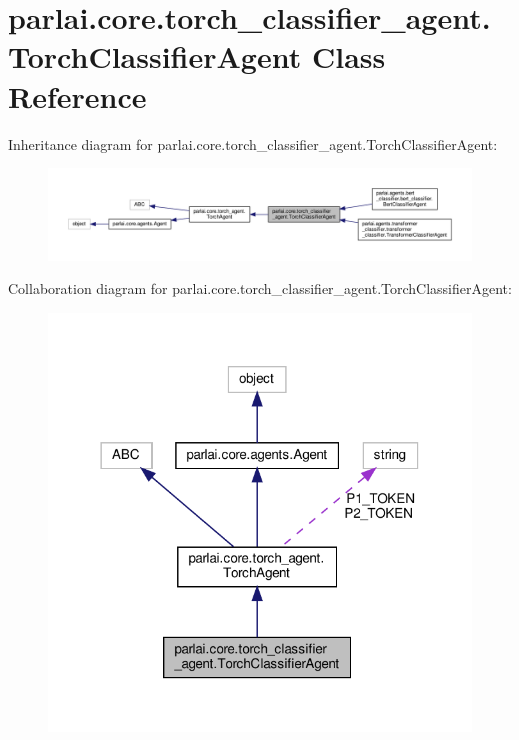 \hypertarget{classparlai_1_1core_1_1torch__classifier__agent_1_1TorchClassifierAgent}{}\section{parlai.\+core.\+torch\+\_\+classifier\+\_\+agent.\+Torch\+Classifier\+Agent Class Reference}
\label{classparlai_1_1core_1_1torch__classifier__agent_1_1TorchClassifierAgent}


Inheritance diagram for parlai.\+core.\+torch\+\_\+classifier\+\_\+agent.\+Torch\+Classifier\+Agent\+:
\nopagebreak
\begin{figure}[H]
\begin{center}
\leavevmode
\includegraphics[width=350pt]{classparlai_1_1core_1_1torch__classifier__agent_1_1TorchClassifierAgent__inherit__graph}
\end{center}
\end{figure}


Collaboration diagram for parlai.\+core.\+torch\+\_\+classifier\+\_\+agent.\+Torch\+Classifier\+Agent\+:
\nopagebreak
\begin{figure}[H]
\begin{center}
\leavevmode
\includegraphics[width=318pt]{classparlai_1_1core_1_1torch__classifier__agent_1_1TorchClassifierAgent__coll__graph}
\end{center}
\end{figure}
